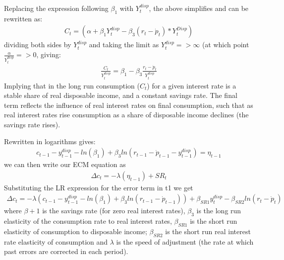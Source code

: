 \documentclass[letterpaper,10pt,english]{jupyterBook}
\begin{document}
\sphinxAtStartPar
Replacing the expression following \(\beta_1\) with \(Y^{disp}_t\), the above simplifies and can be rewritten as:
\begin{equation*}
\begin{split} C_t= (\alpha + \beta_1{Y^{disp}_t}-\beta_3(r_t-\dot{p}_t)*Y^{Disp}_t)\end{split}
\end{equation*}
\sphinxAtStartPar
dividing both sides by \(Y^{disp}_t\) and taking the limit as \({Y^{disp}_t} => \infty\) (at which point \(\frac{\alpha}{Y^{disp}_t} => 0\), giving:
\begin{equation*}
\begin{split}\frac{C_t}{Y^{disp}_t} = \beta_1 -\beta_3\frac{r_t-\dot{p}_t}{Y^{disp}_t}\end{split}
\end{equation*}
\sphinxAtStartPar
Implying that in the long run consumption (\(C_t\)) for a given interest rate is a stable share of real disposable income, and a  constant savings rate. The final term reflects the influence of real interest rates on final consumption, such that as real interest rates rise consumption as a share of disposable income declines (the savings rate rises).

\sphinxAtStartPar
Rewritten in logarithms gives:
\begin{equation*}
\begin{split}{c_{t-1}}-{y^{disp}_{t-1}} - ln(\beta_1) +\beta_3 ln(r_{t-1}-\dot{p}_{t-1} -{y^{disp}_{t-1}})=\eta_{t-1}\end{split}
\end{equation*}
\sphinxAtStartPar
we can then write our ECM equation as
\begin{equation*}
\begin{split} \Delta c_t = -\lambda(\eta_{t-1})+ SR_t \end{split}
\end{equation*}
\sphinxAtStartPar
Substituting the LR expression for the error term in t\sphinxhyphen{}1 we get
\begin{equation*}
\begin{split} \Delta c_t = -\lambda({c_{t-1}}-{y^{disp}_{t-1}} - ln(\beta_1) +\beta_3 ln(r_{t-1}-\dot{p}_{t-1}))+ \beta_{SR1}{y^{disp}_{t}} - \beta_{SR2}ln(r_{t}-\dot{p}_{t})  \end{split}
\end{equation*}
\sphinxAtStartPar
where \(\beta+1\) is the savings rate (for zero real interest rates), \(\beta_3\) is the long run elasticity of the consumption rate to real interest rates,  \(\beta_{SR1}\) is the short run elasticity of consumption to disposable income; \(\beta_{SR2}\) is the short run real interest rate elasticity of consumption and \(\lambda\) is the speed of adjustment (the rate at which past errors are corrected in each period).
\end{document}
